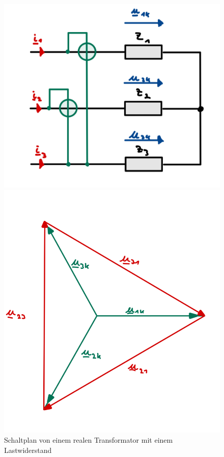 \begin{enumerate}[label=\alph*)]
        \begin{figure}[!h]
          \begin{minipage}[ct]{.5\linewidth}
            \begin{center}
              \includegraphics[width=\linewidth]{img/2.2.1.1.png}
            \end{center}
            \caption{Schaltplan von einem realen Transformator mit einem Lastwiderstand}\label{img/2.2.1.1}
          \end{minipage}
          \hspace{.1\linewidth}
          \begin{minipage}[ct]{.4\linewidth}
            \begin{center}
              \includegraphics[width=\linewidth]{img/2.2.1.2.png}

\end{center}
\end{minipage}
\end{figure}
\end{enumerate}

